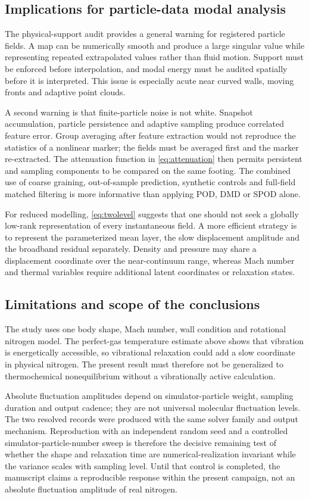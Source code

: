 \subsection{Implications for particle-data modal analysis}
The physical-support audit provides a general warning for registered particle fields. A map can be numerically smooth and produce a large singular value while representing repeated extrapolated values rather than fluid motion. Support must be enforced before interpolation, and modal energy must be audited spatially before it is interpreted. This issue is especially acute near curved walls, moving fronts and adaptive point clouds.

A second warning is that finite-particle noise is not white. Snapshot accumulation, particle persistence and adaptive sampling produce correlated feature error. Group averaging after feature extraction would not reproduce the statistics of a nonlinear marker; the fields must be averaged first and the marker re-extracted. The attenuation function in \cref{eq:attenuation} then permits persistent and sampling components to be compared on the same footing. The combined use of coarse graining, out-of-sample prediction, synthetic controls and full-field matched filtering is more informative than applying POD, DMD or SPOD alone.

For reduced modelling, \cref{eq:twolevel} suggests that one should not seek a globally low-rank representation of every instantaneous field. A more efficient strategy is to represent the parameterized mean layer, the slow displacement amplitude and the broadband residual separately. Density and pressure may share a displacement coordinate over the near-continuum range, whereas Mach number and thermal variables require additional latent coordinates or relaxation states.

\subsection{Limitations and scope of the conclusions}
The study uses one body shape, Mach number, wall condition and rotational nitrogen model. The perfect-gas temperature estimate above shows that vibration is energetically accessible, so vibrational relaxation could add a slow coordinate in physical nitrogen. The present result must therefore not be generalized to thermochemical nonequilibrium without a vibrationally active calculation.

Absolute fluctuation amplitudes depend on simulator-particle weight, sampling duration and output cadence; they are not universal molecular fluctuation levels. The two resolved records were produced with the same solver family and output mechanism. Reproduction with an independent random seed and a controlled simulator-particle-number sweep is therefore the decisive remaining test of whether the shape and relaxation time are numerical-realization invariant while the variance scales with sampling level. Until that control is completed, the manuscript claims a reproducible response within the present campaign, not an absolute fluctuation amplitude of real nitrogen.

